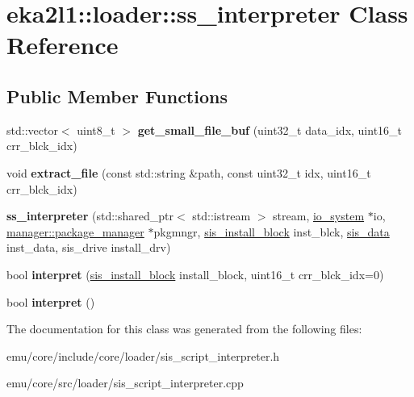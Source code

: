 \hypertarget{classeka2l1_1_1loader_1_1ss__interpreter}{}\section{eka2l1\+:\+:loader\+:\+:ss\+\_\+interpreter Class Reference}
\label{classeka2l1_1_1loader_1_1ss__interpreter}
\subsection*{Public Member Functions}
\begin{DoxyCompactItemize}
\item 
\mbox{\label{classeka2l1_1_1loader_1_1ss__interpreter_a6e4b5999b1fb3569d638361485908919}} 
std\+::vector$<$ uint8\+\_\+t $>$ {\bfseries get\+\_\+small\+\_\+file\+\_\+buf} (uint32\+\_\+t data\+\_\+idx, uint16\+\_\+t crr\+\_\+blck\+\_\+idx)
\item 
\mbox{\label{classeka2l1_1_1loader_1_1ss__interpreter_a6c521a4ce6f4f46ed2975c396d8848ed}} 
void {\bfseries extract\+\_\+file} (const std\+::string \&path, const uint32\+\_\+t idx, uint16\+\_\+t crr\+\_\+blck\+\_\+idx)
\item 
\mbox{\label{classeka2l1_1_1loader_1_1ss__interpreter_a15910a9396e5ea46e1fce1e369df2ea5}} 
{\bfseries ss\+\_\+interpreter} (std\+::shared\+\_\+ptr$<$ std\+::istream $>$ stream, \mbox{\hyperlink{classeka2l1_1_1io__system}{io\+\_\+system}} $\ast$io, \mbox{\hyperlink{classeka2l1_1_1manager_1_1package__manager}{manager\+::package\+\_\+manager}} $\ast$pkgmngr, \mbox{\hyperlink{structeka2l1_1_1loader_1_1sis__install__block}{sis\+\_\+install\+\_\+block}} inst\+\_\+blck, \mbox{\hyperlink{structeka2l1_1_1loader_1_1sis__data}{sis\+\_\+data}} inst\+\_\+data, sis\+\_\+drive install\+\_\+drv)
\item 
\mbox{\label{classeka2l1_1_1loader_1_1ss__interpreter_a106cfc1fbf9a7979dceca30dca3e239a}} 
bool {\bfseries interpret} (\mbox{\hyperlink{structeka2l1_1_1loader_1_1sis__install__block}{sis\+\_\+install\+\_\+block}} install\+\_\+block, uint16\+\_\+t crr\+\_\+blck\+\_\+idx=0)
\item 
\mbox{\label{classeka2l1_1_1loader_1_1ss__interpreter_a0489f1459b6b06f2eb9f816c99584afb}} 
bool {\bfseries interpret} ()
\end{DoxyCompactItemize}


The documentation for this class was generated from the following files\+:\begin{DoxyCompactItemize}
\item 
emu/core/include/core/loader/sis\+\_\+script\+\_\+interpreter.\+h\item 
emu/core/src/loader/sis\+\_\+script\+\_\+interpreter.\+cpp\end{DoxyCompactItemize}
